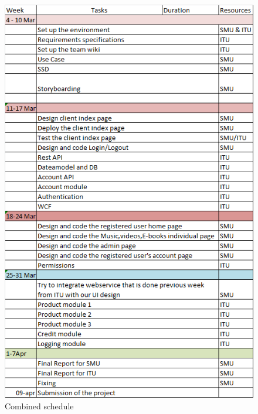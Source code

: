 \begin{figure}[H]
\includegraphics[scale=0.8]{illustrations/SmuSchedule.png}
\caption{Combined schedule}
\end{figure}
\newpage

\label{smuwiki}
\newpage

